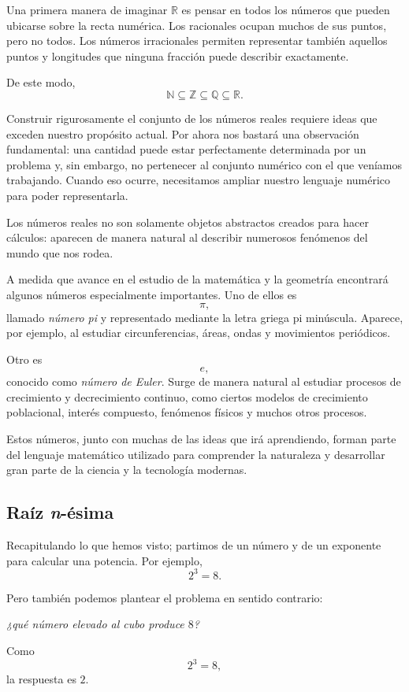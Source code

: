 Una primera manera de imaginar \(\mathbb R\) es pensar en todos los números que pueden ubicarse sobre la recta numérica. Los racionales ocupan muchos de sus puntos, pero no todos. Los números irracionales permiten representar también aquellos puntos y longitudes que ninguna fracción puede describir exactamente.

De este modo,
\[
\mathbb N\subseteq\mathbb Z\subseteq\mathbb Q\subseteq\mathbb R.
\]

Construir rigurosamente el conjunto de los números reales requiere ideas que exceden nuestro propósito actual. Por ahora nos bastará una observación fundamental: una cantidad puede estar perfectamente determinada por un problema y, sin embargo, no pertenecer al conjunto numérico con el que veníamos trabajando. Cuando eso ocurre, necesitamos ampliar nuestro lenguaje numérico para poder representarla.

\begin{note}
Los números reales no son solamente objetos abstractos creados para hacer cálculos: aparecen de manera natural al describir numerosos fenómenos del mundo que nos rodea.

A medida que avance en el estudio de la matemática y la geometría encontrará algunos números especialmente importantes. Uno de ellos es
\[
\pi,
\]
llamado \emph{número pi} y representado mediante la letra griega pi minúscula. Aparece, por ejemplo, al estudiar circunferencias, áreas, ondas y movimientos periódicos.

Otro es
\[
e,
\]
conocido como \emph{número de Euler}. Surge de manera natural al estudiar procesos de crecimiento y decrecimiento continuo, como ciertos modelos de crecimiento poblacional, interés compuesto, fenómenos físicos y muchos otros procesos.

Estos números, junto con muchas de las ideas que irá aprendiendo, forman parte del lenguaje matemático utilizado para comprender la naturaleza y desarrollar gran parte de la ciencia y la tecnología modernas.
\end{note}

\subsection{Raíz \textit{n}-ésima}

Recapitulando lo que hemos visto; partimos de un número y de un exponente para calcular una potencia. Por ejemplo,
\[
2^3=8.
\]

Pero también podemos plantear el problema en sentido contrario:
\begin{center}
\textit{¿qué número elevado al cubo produce \(8\)?}
\end{center}
Como
\[
2^3=8,
\]
la respuesta es \(2\).

